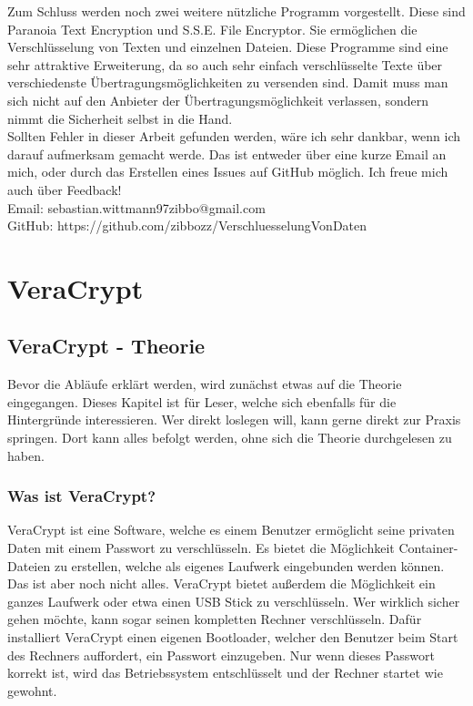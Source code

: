 \documentclass[12pt,a4paper]{scrreprt}
\begin{document}
\noindent Zum Schluss werden noch zwei weitere nützliche Programm vorgestellt. Diese sind Paranoia Text Encryption und S.S.E. File Encryptor. Sie ermöglichen die Verschlüsselung von Texten und einzelnen Dateien. Diese Programme sind eine sehr attraktive Erweiterung, da so auch sehr einfach verschlüsselte Texte über verschiedenste Übertragungsmöglichkeiten zu versenden sind. Damit muss man sich nicht auf den Anbieter der Übertragungsmöglichkeit verlassen, sondern nimmt die Sicherheit selbst in die Hand.\\

\noindent Sollten Fehler in dieser Arbeit gefunden werden, wäre ich sehr dankbar, wenn ich darauf aufmerksam gemacht werde. Das ist entweder über eine kurze Email an mich, oder durch das Erstellen eines Issues auf GitHub möglich. Ich freue mich auch über Feedback!\\

\noindent Email: sebastian.wittmann97zibbo@gmail.com\\

\noindent GitHub: https://github.com/zibbozz/VerschluesselungVonDaten

\part{VeraCrypt}

\chapter{VeraCrypt - Theorie}
Bevor die Abläufe erklärt werden, wird zunächst etwas auf die Theorie eingegangen. Dieses Kapitel ist für Leser, welche sich ebenfalls für die Hintergründe interessieren. Wer direkt loslegen will, kann gerne direkt zur Praxis springen. Dort kann alles befolgt werden, ohne sich die Theorie durchgelesen zu haben.

\section{Was ist VeraCrypt?}
VeraCrypt ist eine Software, welche es einem Benutzer ermöglicht seine privaten Daten mit einem Passwort zu verschlüsseln. Es bietet die Möglichkeit Container-Dateien zu erstellen, welche als eigenes Laufwerk eingebunden werden können. Das ist aber noch nicht alles. VeraCrypt bietet außerdem die Möglichkeit ein ganzes Laufwerk oder etwa einen USB Stick zu verschlüsseln. Wer wirklich sicher gehen möchte, kann sogar seinen kompletten Rechner verschlüsseln. Dafür installiert VeraCrypt einen eigenen Bootloader, welcher den Benutzer beim Start des Rechners auffordert, ein Passwort einzugeben. Nur wenn dieses Passwort korrekt ist, wird das Betriebssystem entschlüsselt und der Rechner startet wie gewohnt. \\
\end{document}
